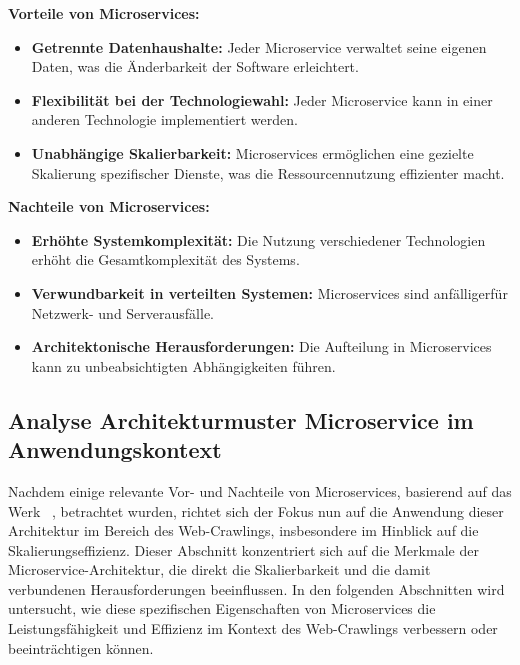     \textbf{Vorteile von Microservices:}
    \begin{itemize}
      \item \textbf{Getrennte Datenhaushalte:} Jeder Microservice verwaltet seine eigenen Daten, was die Änderbarkeit der Software erleichtert.
            
      \item \textbf{Flexibilität bei der Technologiewahl:} Jeder Microservice kann in einer anderen Technologie implementiert werden.

      \item \textbf{Unabhängige Skalierbarkeit:} Microservices ermöglichen eine gezielte Skalierung spezifischer Dienste, was die Ressourcennutzung effizienter macht.


    \end{itemize}
    
    \textbf{Nachteile von Microservices:}
    \begin{itemize}
      \item \textbf{Erhöhte Systemkomplexität:} Die Nutzung verschiedener Technologien erhöht die Gesamtkomplexität des Systems.
      
      \item \textbf{Verwundbarkeit in verteilten Systemen:} Microservices sind anfälliger\newline für Netzwerk- und Serverausfälle.
      
      \item \textbf{Architektonische Herausforderungen:} Die Aufteilung in Microservices kann zu unbeabsichtigten Abhängigkeiten führen.
    \end{itemize} 



\subsection[Analyse Microservice im Anwendungskontext]{Analyse Architekturmuster Microservice im Anwendungskontext}\label{subsec:microservicekontextcrawler}
Nachdem einige relevante Vor- und Nachteile von Microservices, basierend auf das Werk  ~\parencite[vgl.][S. 14-17]{Wolff_2018}, betrachtet wurden, richtet sich der Fokus nun auf die Anwendung dieser Architektur im Bereich des Web-Crawlings, insbesondere im Hinblick auf die Skalierungseffizienz. Dieser Abschnitt konzentriert sich auf die Merkmale der Microservice-Architektur, die direkt die Skalierbarkeit und die damit verbundenen Herausforderungen beeinflussen. In den folgenden Abschnitten wird untersucht, wie diese spezifischen Eigenschaften von Microservices die Leistungsfähigkeit und Effizienz im Kontext des Web-Crawlings verbessern oder beeinträchtigen können.


